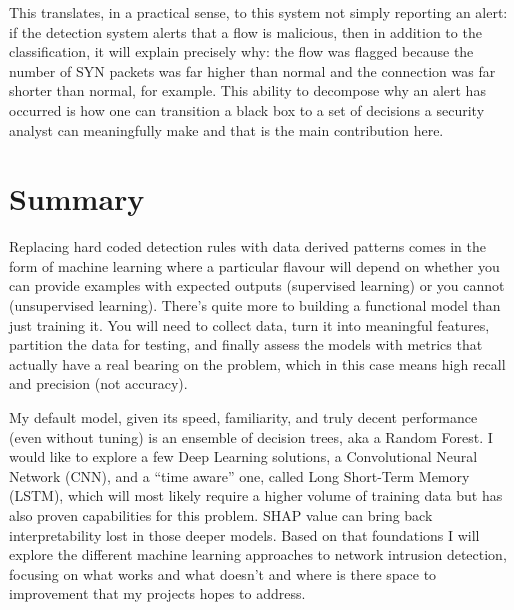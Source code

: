 This translates, in a practical sense, to this system not simply reporting an alert: if the detection system alerts that a flow is malicious, then in addition to the classification, it will explain precisely why: the flow was flagged because the number of SYN packets was far higher than normal and the connection was far shorter than normal, for example. This ability to decompose why an alert has occurred is how one can transition a black box to a set of decisions a security analyst can meaningfully make and that is the main contribution here.
\section{Summary}
 
Replacing hard coded detection rules with data derived patterns comes in the form of machine learning where a particular flavour will depend on whether you can provide examples with expected outputs (supervised learning) or you cannot (unsupervised learning). There’s quite more to building a functional model than just training it. You will need to collect data, turn it into meaningful features, partition the data for testing, and finally assess the models with metrics that actually have a real bearing on the problem, which in this case means high recall and precision (not accuracy).

My default model, given its speed, familiarity, and truly decent performance (even without tuning) is an ensemble of decision trees, aka a Random Forest. I would like to explore a few Deep Learning solutions, a Convolutional Neural Network (CNN), and a “time aware” one, called Long Short-Term Memory (LSTM), which will most likely require a higher volume of training data but has also proven capabilities for this problem. SHAP value can bring back interpretability lost in those deeper models.
Based on that foundations I will explore the different machine learning approaches to network intrusion detection, focusing on what works and what doesn’t and where is there space to improvement that my projects hopes to address.
